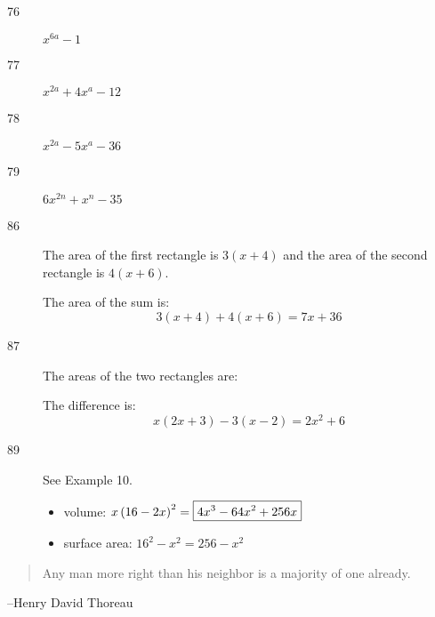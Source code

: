 \documentclass[letterpaper, landscape]{exam}
\begin{document}
\begin{description}
      \item[76] $x^{6a} - 1$

      \item[77] $x^{2a} + 4x^a - 12$

      \item[78] $x^{2a} - 5x^a - 36$

      \item[79] $6x^{2n} + x^n - 35$

      \item[86]
        The area of the first rectangle is $3(x + 4)$ and the area of the second rectangle is 
        $4(x + 6)$.  
        

        The area of the sum is: 
        \[ 
          3(x + 4) + 4(x + 6) = \boxed{ 7x + 36 } 
        \]

      \item[87]
        The areas of the two rectangles are:
        
        The difference is: 
        \[ 
          x(2x + 3) - 3(x - 2 )= \boxed{ 2x^2 + 6 } 
        \]

      \item[89]
        See Example 10.

        \begin{itemize}
          \item volume: $x \del{16 - 2x}^2 = \boxed{ 4x^3 - 64x^2 + 256x }$
          \item surface area: $16^2 - x^2 = \boxed{ 256 - x^2 }$
        \end{itemize}

    \end{description}
  \fi
  \ifprintanswers{}
  \else
    \vspace{11 cm}
    \begin{quote}
      \begin{em}
        Any man more right than his neighbor is a majority of one already.
      \end{em}
    \end{quote}
    \hspace{2 cm}--Henry David Thoreau
  \fi
\end{document}
